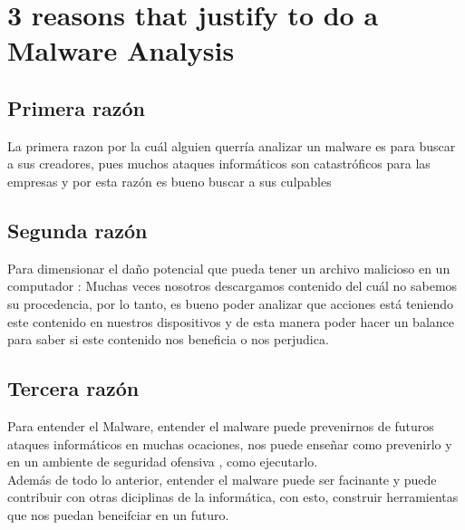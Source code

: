 \documentclass[10pt,a4paper]{article} %
\begin{document}
    \title{\rmfamily\normalfont{}}
    \author{}
    \date{\today} 
    
    \maketitle
     

        \section{3 reasons that justify to do a Malware Analysis}
            \subsection{Primera razón}
                La primera razon por la cuál alguien querría analizar un malware es
                para buscar a sus creadores, pues muchos ataques informáticos son
                catastróficos para las empresas y por esta razón es bueno buscar a sus
                culpables

            \subsection{Segunda razón}
                Para dimensionar el daño potencial que pueda tener un archivo malicioso
                en un computador : Muchas veces nosotros descargamos contenido del cuál
                no sabemos su procedencia, por lo tanto, es bueno poder analizar que
                acciones está teniendo este contenido en nuestros dispositivos y de
                esta manera poder hacer un balance para saber si este contenido nos
                beneficia o nos perjudica.

            \subsection{Tercera razón}
                Para entender el Malware, entender el malware puede prevenirnos de
                futuros ataques informáticos en muchas ocaciones, nos puede enseñar
                como prevenirlo y en un ambiente de seguridad ofensiva , como
                ejecutarlo.
                \\ Además de todo lo anterior, entender el malware puede ser facinante
                y puede contribuir con otras diciplinas de la informática, con esto,
                construir herramientas que nos puedan beneifciar en un futuro.
\end{document}
